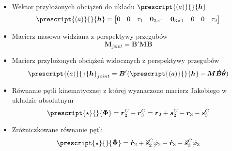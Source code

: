 \begin{itemize}
    \item Wektor przyłożonych obciążeń do układu $\prescript{(a)}{}{\boldsymbol{h}}$
        \begin{equation}
            \label{eq:h_applied}
                \prescript{(a)}{}{\boldsymbol{h}} = \begin{bmatrix}
                                                0 & 0 & \tau_1 &\boldsymbol{0}_{3\times1} &\boldsymbol{0}_{3\times1}&0&0 &\tau_2
                                                \end{bmatrix}
        \end{equation}
    \item Macierz masowa widziana z perspektywy przegubów
        \begin{equation}
            \label{eq:mass_matrix_joint}
                \boldsymbol{M}_{joint} = \boldsymbol{B}'\boldsymbol{M}\boldsymbol{B}
        \end{equation}
    \item Macierz przyłożonych obciążeń widocznych z perspektywy przegubów
        \begin{equation}
            \label{eq:h_applied_joint}
                \prescript{(a)}{}{\boldsymbol{h}}_{joint} = \boldsymbol{B}'(\prescript{(a)}{}{\boldsymbol{h}} -\boldsymbol{M}\boldsymbol{\dot B}\boldsymbol{\dot \theta})
        \end{equation}

    \item Równanie pętli kinematycznej z której wyznaczono macierz Jakobiego w układzie absolutnym
        \begin{equation}
            \label{eq:vector_loop}
            \prescript{\star}{}{\boldsymbol{\Phi}} = \boldsymbol{r}_2^C - \boldsymbol{r}_3^C = \boldsymbol{r}_2 + \boldsymbol{s}_2^C-\boldsymbol{r}_3- \boldsymbol{s}_3^C
        \end{equation}
    \item Zróżniczkowane równanie pętli
        \begin{equation}
            \label{eq:vector_loop_differentiated}
            \prescript{\star}{}{\boldsymbol{\dot \Phi}} = \boldsymbol{\dot r}_2 + \boldsymbol{\breve s}_2^C\dot \varphi_2-\boldsymbol{\dot r}_3- \boldsymbol{\breve s}_3^C\dot \varphi_3
        \end{equation}


\end{itemize}
